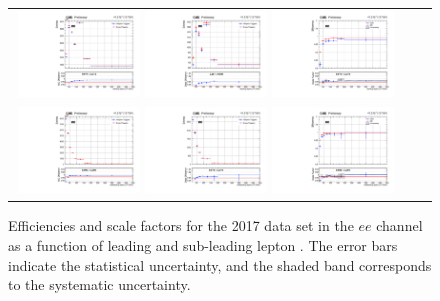 \begin{figure}[h]
  \begin{center}
    \begin{tabular}{ccc}
      \includegraphics[width=0.32\textwidth]{fig_2017_TrigSF/g_lepApt_ee_MC.pdf}
      \includegraphics[width=0.32\textwidth]{fig_2017_TrigSF/g_lepApt_ee_data.pdf}
      \includegraphics[width=0.32\textwidth]{fig_2017_TrigSF/g_ee_lepApt_FullSystUncBand.pdf}\\
      \includegraphics[width=0.32\textwidth]{fig_2017_TrigSF/g_lepBpt_ee_MC.pdf}
      \includegraphics[width=0.32\textwidth]{fig_2017_TrigSF/g_lepBpt_ee_data.pdf}
      \includegraphics[width=0.32\textwidth]{fig_2017_TrigSF/g_ee_lepBpt_FullSystUncBand.pdf}\\
    \end{tabular}
    \caption{Efficiencies and scale factors for the 2017 data set in the $ee$ channel as a function of leading and sub-leading lepton \pT.
            The error bars indicate the statistical uncertainty, and the shaded band corresponds to the systematic uncertainty.
            }
    \label{TrigSF_2017_2}
  \end{center}
\end{figure}

